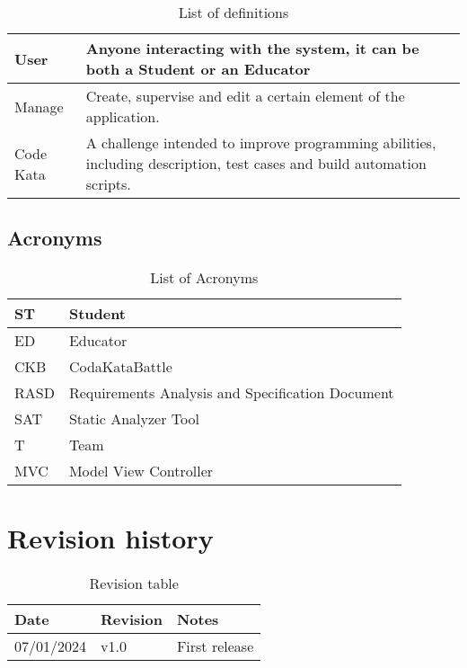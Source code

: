 \begin{table}[H]
  \begin{tabular}{|l|p{}|}

    \hline
    User & Anyone interacting with the system, it can be both a Student or an Educator    \\
    \hline
    Manage & Create, supervise and edit a certain element of the application. \\
    \hline
    Code Kata & A challenge intended to improve programming abilities, including description, test cases and build automation scripts. \\
    \hline
  \end{tabular}
  \caption{List of definitions}
  \label{tab:definitions}
\end{table}

\subsection{Acronyms}
\label{ss:Acronyms}

\begin{table}[H]
  \begin{tabular}{|l|l|}

    \hline
    ST & Student \\
    \hline
    ED & Educator \\
    \hline
    CKB & CodaKataBattle \\
    \hline
    RASD & Requirements Analysis and Specification Document     \\
    \hline
    SAT & Static Analyzer Tool    \\
    \hline
    T & Team    \\
    \hline
    MVC & Model View Controller    \\
    \hline
  \end{tabular}
  \caption{List of Acronyms}
  \label{tab:acronyms}
\end{table}


\section{Revision history}
\label{s:revision-history}%

\begin{table}[H]
  \begin{tabular}{|l|l|l|}

    \hline
    Date & Revision & Notes    \\
    \hline
    07/01/2024 & v1.0 & First release    \\
    \hline

  \end{tabular}
  \caption{Revision table}
  \label{tab:revision}
\end{table}

